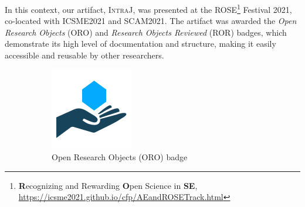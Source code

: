 In this context, our artifact, \textsc{IntraJ}, was presented at the 
ROSE\footnote{\textbf{R}ecognizing and Rewarding \textbf{O}pen Science in \textbf{SE}, 
\url{https://icsme2021.github.io/cfp/AEandROSETrack.html}} Festival 2021, 
co-located with ICSME2021 and SCAM2021. The artifact was awarded the \emph{Open Research Objects} 
(ORO) and \emph{Research Objects Reviewed} (ROR) badges, which demonstrate its high level of documentation 
and structure, making it easily accessible and reusable by other researchers.
\begin{figure}[htbp]
  \centering
  \begin{subfigure}{0.3\linewidth}
    \includegraphics[width=\linewidth]{kappa/img/Open_research.png}
    \caption{Open Research Objects (ORO) badge}
    \label{fig:ORO}
  \end{subfigure}\hspace{2cm}
  \begin{subfigure}{0.3\linewidth}

\end{subfigure}
\end{figure}

